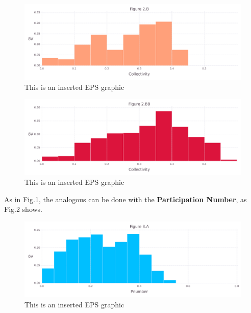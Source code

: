 \documentclass[10pt,letterpaper]{article}
\begin{document}
\begin{figure}[ht]
\begin{center}
\includegraphics[scale=0.5]{1xkk/2bfigure.pdf}
\caption{This is an inserted EPS graphic}
\label{fig5}
\end{center}
\end{figure}

\begin{figure}[ht]
\begin{center}
\includegraphics[scale=0.5]{1xkk/2bbfigure.pdf}
\caption{This is an inserted EPS graphic}
\label{fig6}
\end{center}
\end{figure}

\clearpage
As in Fig.1, the analogous can be done with the \textbf{Participation Number}, as Fig.2 shows.

\begin{figure}[ht]
\begin{center}
\includegraphics[scale=0.5]{1xkk/3afigure.pdf}
\caption{This is an inserted EPS graphic}
\label{fig7}
\end{center}
\end{figure}
\end{document}
